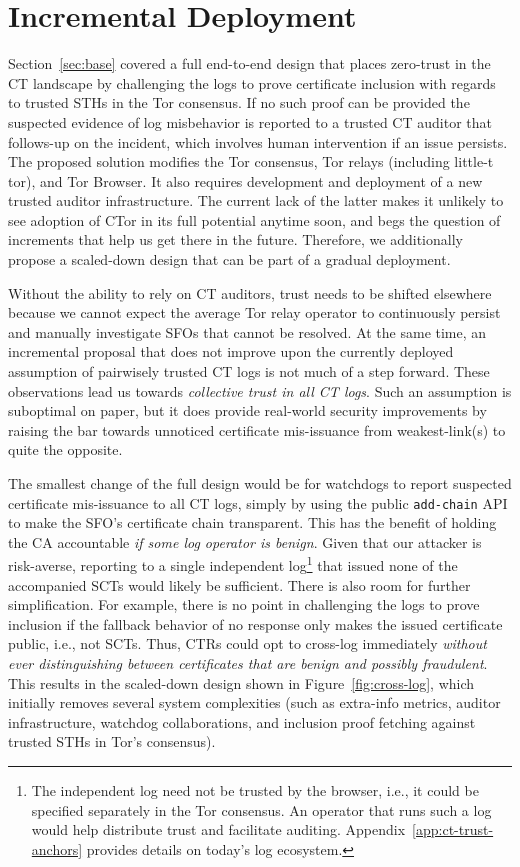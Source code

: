 \section{Incremental Deployment} \label{sec:incremental} Section~\ref{sec:base}
covered a full end-to-end design that places zero-trust in the CT landscape by
challenging the logs to prove certificate inclusion with regards to trusted STHs
in the Tor consensus.  If no such proof can be provided the suspected evidence
of log misbehavior is reported to a trusted CT auditor that follows-up on the
incident, which involves human intervention if an issue persists.  The proposed
solution modifies the Tor consensus, Tor relays (including little-t tor), and
Tor Browser.  It also requires development and deployment of a new trusted
auditor infrastructure.  The current lack of the latter makes it unlikely to see
adoption of CTor in its full potential anytime soon, and begs the question of
increments that help us get there in the future.  Therefore, we additionally
propose a scaled-down design that can be part of a gradual deployment.

Without the ability to rely on CT auditors, trust needs to be shifted elsewhere
because we cannot expect the average Tor relay operator to continuously persist
and manually investigate SFOs that cannot be resolved.  At the same time, an
incremental proposal that does not improve upon the currently deployed
assumption of pairwisely trusted CT logs is not much of a step forward.
These observations lead us towards
	\emph{collective trust in all CT logs}.
Such an assumption is suboptimal on paper, but it does provide real-world
security improvements by raising the bar towards unnoticed certificate
mis-issuance from weakest-link(s) to quite the opposite.

The smallest change of the full design would be for watchdogs to report
suspected certificate mis-issuance to all CT logs, simply by using the public
\texttt{add-chain} API to make the SFO's certificate chain transparent.  This
has the benefit of holding the CA accountable \emph{if some log operator is
benign}.  Given that our attacker is risk-averse, reporting to a single
independent log\footnote{%
	The independent log need not be trusted by the browser, i.e., it could be
	specified separately in the Tor consensus.  An operator that runs such a
	log would help distribute trust and facilitate auditing.
	Appendix~\ref{app:ct-trust-anchors} provides details on today's log
	ecosystem.
} that issued none of the accompanied SCTs would likely be sufficient.  There is
also room for further simplification.  For example, there is no point in
challenging the logs to prove inclusion if the fallback behavior of no response
only makes the issued certificate public, i.e., not SCTs.  Thus, CTRs could opt
to cross-log immediately \emph{without ever distinguishing between certificates
that are benign and possibly fraudulent}.  This results in the scaled-down
design shown in Figure~\ref{fig:cross-log}, which initially removes several
system complexities (such as extra-info metrics, auditor infrastructure,
watchdog collaborations, and inclusion proof fetching against trusted STHs in
Tor's consensus).

